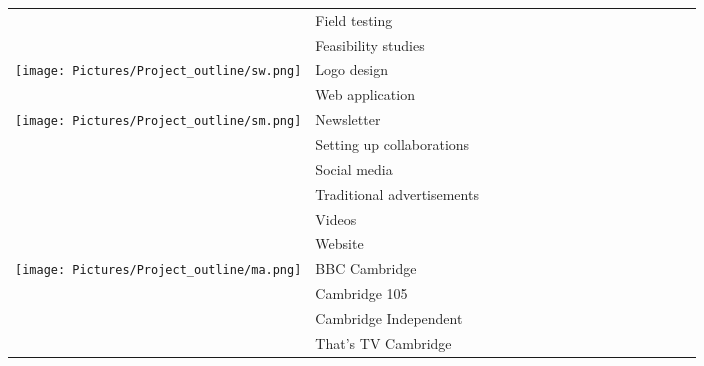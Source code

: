 \begin{table}[h]
{\begin{tabular}{l l c c c c c c c c c c c c c c c}
& \small Field testing & \cellcolor{teal!25} & \cellcolor{teal!25} & \cellcolor{teal!25} & & & & & & \cellcolor{teal!25} & & \cellcolor{teal!25} & \cellcolor{teal!25} & \cellcolor{teal!25} & & \\

& \small Feasibility studies & \cellcolor{teal!25} & & & & \cellcolor{teal!25} & & & \cellcolor{teal!25} & & \cellcolor{teal!25} & & & \cellcolor{teal!25} & & \\
\midrule

\texttt{[image: Pictures/Project\_outline/sw.png]} & \small Logo design & & & \cellcolor{cyan!25}& &\cellcolor{cyan!25} & \cellcolor{cyan!25}  & & & & & & & & & \\
& \small Web application & & & & & & \cellcolor{cyan!25}  & & & & & & & & & \\
\midrule

\texttt{[image: Pictures/Project\_outline/sm.png]} & \small Newsletter & \cellcolor{olive!25} & & & & & & & & & & \cellcolor{olive!25} & & & & \\

& \small Setting up collaborations & \cellcolor{olive!25} &  \cellcolor{olive!25} & & & \cellcolor{olive!25}  & & &  \cellcolor{olive!25} & & & & \cellcolor{olive!25} &  \cellcolor{olive!25} & &  \\

& \small Social media & & \cellcolor{olive!25} & & & & & & & & & & & & &  \\

& \small Traditional advertisements & & & \cellcolor{olive!25} & & \cellcolor{olive!25} & & & & & & \cellcolor{olive!25} & & & &  \\

& \small Videos & & & \cellcolor{olive!25} & & \cellcolor{olive!25} & & & & \cellcolor{olive!25} & & \cellcolor{olive!25} & & & &  \\

& \small Website & & & & & & & & & & & \cellcolor{olive!25} & & \cellcolor{olive!25} & &  \\
\midrule

\texttt{[image: Pictures/Project\_outline/ma.png]} & \small BBC Cambridge & & \cellcolor{lime!25} & & & & \cellcolor{lime!25} & & & & & & & & &  \\
& \small Cambridge 105 & & & & & & & & & \cellcolor{lime!25} & & & & \cellcolor{lime!25} & &  \\
& \small Cambridge Independent & & \cellcolor{lime!25} & & & & & & & \cellcolor{lime!25} & & & & & &  \\
& \small \small That's TV Cambridge & & & & & & & \cellcolor{lime!25} & & \cellcolor{lime!25} & & \cellcolor{lime!25} & & & &  \\


\end{tabular}}
\end{table}
